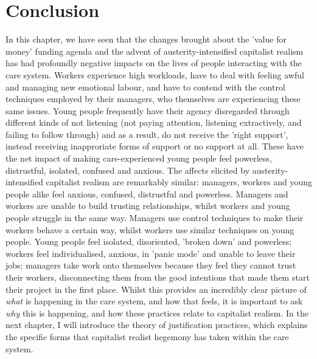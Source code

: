 \section{Conclusion}
In this chapter, we have seen that the changes brought about the 'value for money' funding agenda and the advent of austerity-intensified capitalist realism has had profoundly negative impacts on the lives of people interacting with the care system. Workers experience high workloads, have to deal with feeling awful and managing new emotional labour, and have to contend with the control techniques employed by their managers, who themselves are experiencing these same issues. Young people frequently have their agency disregarded through different kinds of not listening (not paying attention, listening extractively, and failing to follow through) and as a result, do not receive the 'right support', instead receiving inapproriate forms of support or no support at all. These have the net impact of making care-experienced young people feel powerless, distrustful, isolated, confused and anxious. The affects elicited by austerity-intensified capitalist realism are remarkably similar: managers, workers and young people alike feel anxious, confused, distrustful and powerless. Managers and workers are unable to build trusting relationships, whilst workers and young people struggle in the same way. Managers use control techniques to make their workers behave a certain way, whilst workers use similar techniques on young people. Young people feel isolated, disoriented, 'broken down' and powerless; workers feel individualised, anxious, in 'panic mode' and unable to leave their jobs; managers take work onto themselves because they feel they cannot trust their workers, disconnecting them from the good intentions that made them start their project in the first place. Whilst this provides an incredibly clear picture of \textit{what} is happening in the care system, and how that feels, it is important to ask \textit{why} this is happening, and how these practices relate to capitalist realism. In the next chapter, I will introduce the theory of justification practices, which explains the specific forms that capitalist realist hegemony has taken within the care system.



